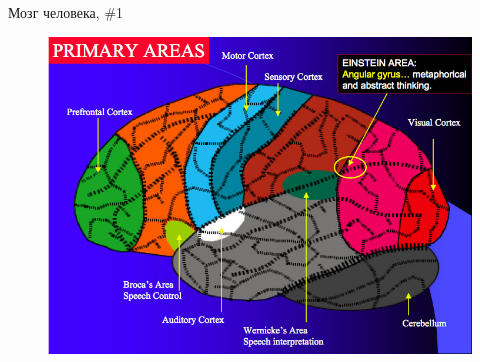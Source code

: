 \documentclass[10pt]{beamer}
\begin{document}
\begin{frame}{Мозг человека, \#1}

\begin{figure}[h!]
  \centering
  \includegraphics[width=1\textwidth]{images/Brain_2.jpg}
\end{figure}

\end{frame}
\end{document}
